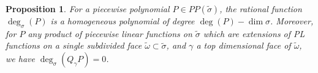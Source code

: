 \documentclass[12pt, oneside]{amsart}   	%
\newcounter{thm}
\newtheorem{proposition}[thm]{Proposition}
\numberwithin{equation}{section}
\numberwithin{thm}{section}
\numberwithin{figure}{section}
\begin{document}
\begin{proposition}\label{degprop}
For a piecewise polynomial $P \in PP(\widetilde{\sigma})$, the rational function $\deg_{\sigma}(P)$ is a homogeneous polynomial of degree $\deg(P) - \dim\sigma$. Moreover, for $P$ any product of piecewise linear functions on $\tilde{\sigma}$ which are extensions of PL functions on a single subdivided face $\widetilde{\omega} \subset \widetilde{\sigma}$, and $\gamma$ a top dimensional face of $\widetilde{\omega}$, we have $\deg_{\sigma}(Q_{\gamma}P) = 0$.




\end{proposition}
\end{document}
